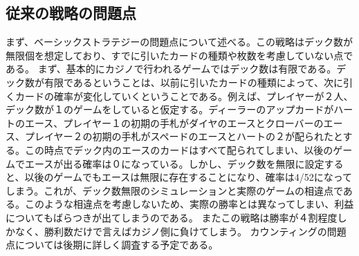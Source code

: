 \subsection{従来の戦略の問題点}
まず、ベーシックストラテジーの問題点について述べる。この戦略はデック数が無限個を想定しており、すでに引いたカードの種類や枚数を考慮していない点である。
まず、基本的にカジノで行われるゲームではデック数は有限である。デック数が有限であるということは、以前に引いたカードの種類によって、次に引くカードの確率が変化していくということである。例えば、プレイヤーが２人、デック数が１のゲームをしていると仮定する。ディーラーのアップカードがハートのエース、プレイヤー１の初期の手札がダイヤのエースとクローバーのエース、プレイヤー２の初期の手札がスペードのエースとハートの２が配られたとする。この時点でデック内のエースのカードはすべて配られてしまい、以後のゲームでエースが出る確率は０になっている。しかし、デック数を無限に設定すると、以後のゲームでもエースは無限に存在することになり、確率は4/52になってしまう。これが、デック数無限のシミュレーションと実際のゲームの相違点である。このような相違点を考慮しないため、実際の勝率とは異なってしまい、利益についてもばらつきが出てしまうのである。
またこの戦略は勝率が４割程度しかなく、勝利数だけで言えばカジノ側に負けてしまう。
カウンティングの問題点については後期に詳しく調査する予定である。

